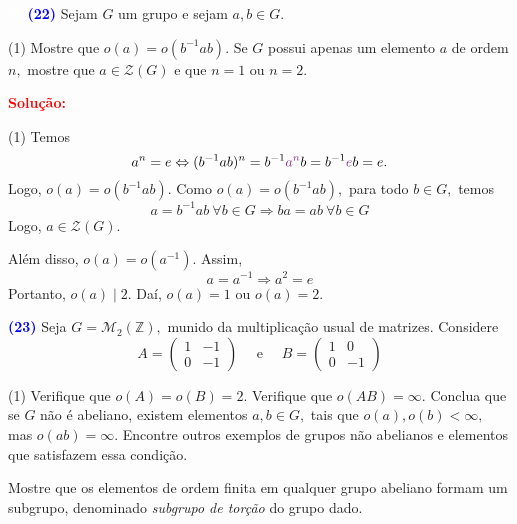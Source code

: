 \documentclass[12pt, a4paper]{article}
\newcommand{\negrito}[1]{\mbox{\boldmath{$#1$}}}
\begin{document}
\textcolor{white}{Oi}\newline\newline
\textcolor{blue}{\bf(22)}\label{29} Sejam $G$ um grupo e sejam $a,b \in G.$
\begin{tasks}[counter-format={(tsk[a])},label-width=3.6ex, label-format = {\bfseries}, column-sep = {0pt}](1)
\task[\textcolor{Floresta}{$\negrito{(a)} $}] Mostre que $o(a) = o(b^{-1}ab).$
\task[\textcolor{Floresta}{$\negrito{(b)} $}] Se $G$ possui apenas um elemento $a$ de ordem $n,$ mostre que $a \in \mathcal{Z}(G)$ e que $n = 1$ ou $n = 2.$ 
\end{tasks}
\textbf{\textcolor{red}{Solução:}}
\begin{tasks}[counter-format={(tsk[a])},label-width=3.6ex, label-format = {\bfseries}, column-sep = {0pt}](1)
\task[\textcolor{Floresta}{$\negrito{(a)} $}] Temos
\[
a^n = e \Leftrightarrow (b^{-1}ab)^n = b^{-1}\textcolor{Fuchsia}{a^n}b =  b^{-1}\textcolor{Fuchsia}{e}b = e.
\]
Logo, $o(a) = o(b^{-1}ab).$
\task[\textcolor{Floresta}{$\negrito{(b)} $}] Como  $o(a) = o(b^{-1}ab),$ para todo $b \in G,$ temos
\[
a =b^{-1}ab \ \forall b \in G \Rightarrow ba = ab \ \forall b \in G
\]
Logo, $a \in \mathcal{Z}(G).$

Além disso, $o(a) = o(a^{-1}).$ Assim, 
\[
a = a^{ -1} \Rightarrow a^2 = e
\]
Portanto, $o(a) \mid 2.$ Daí, $o(a) = 1$ ou $o(a) = 2.$
\end{tasks}
\textcolor{blue}{\bf(23)}\label{30} Seja $G = \mathcal{M}_2(\mathbb{Z}),$ munido da multiplicação usual de matrizes. Considere
\[
A = \left( \begin{array}{cc} 1 & -1 \\ 0 & -1 \end{array} \right) \quad \mbox{ e } \quad B = \left( \begin{array}{cc} 1 & 0 \\ 0 & -1 \end{array} \right) 
\]
\begin{tasks}[counter-format={(tsk[a])},label-width=3.6ex, label-format = {\bfseries}, column-sep = {0pt}](1)
\task[\textcolor{Floresta}{$\negrito{(a)} $}] Verifique que $o(A) = o(B) = 2.$
\task[\textcolor{Floresta}{$\negrito{(b)} $}] Verifique que $o(AB) = \infty.$
\task[\textcolor{Floresta}{$\negrito{(c)} $}] Conclua que se $G$ não é abeliano, existem elementos $a, b \in G,$ tais que $o(a), o(b) < \infty,$ mas $o(ab) = \infty.$
\task[\textcolor{Floresta}{$\negrito{(d)} $}] Encontre outros exemplos de grupos não abelianos e elementos que satisfazem essa condição.

\task[\textcolor{Floresta}{$\negrito{(e)} $}] Mostre que os elementos de ordem finita em qualquer grupo abeliano formam um subgrupo, denominado \emph{subgrupo de torção} do grupo dado.
\end{tasks}
\end{document}
